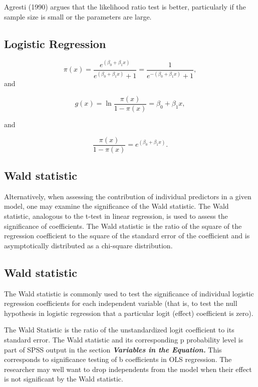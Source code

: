 \documentclass[a4paper,12pt]{article}
\begin{document}
Agresti (1990) argues that the likelihood ratio test is better, particularly if the sample size is small or the parameters are large.

\subsection{Logistic Regression}

\[ \pi(x) = \frac{e^{(\beta_0 + \beta_1 x)}} {e^{(\beta_0 + \beta_1 x)} + 1} = \frac {1} {e^{-(\beta_0 + \beta_1 x)} + 1},\]
and

\[g(x) = \ln \frac {\pi(x)} {1 - \pi(x)} = \beta_0 + \beta_1 x ,\]

and

\[\frac{\pi(x)} {1 - \pi(x)} = e^{(\beta_0 + \beta_1 x)}.\]

\subsection{Wald statistic}

Alternatively, when assessing the contribution of individual predictors in a given model, one may examine the significance of the Wald statistic. The Wald statistic, analogous to the t-test in linear regression, is used to assess the significance of coefficients. The Wald statistic is the ratio of the square of the regression coefficient to the square of the standard error of the coefficient and is asymptotically distributed as a chi-square distribution.



\subsection{Wald statistic}
The Wald statistic is commonly used to test the significance of individual logistic regression coefficients for each independent variable (that is, to test the null hypothesis in logistic regression that a particular logit (effect) coefficient is zero). 

The Wald Statistic is the ratio of the unstandardized logit coefficient to its standard error. The Wald statistic and its corresponding p probability level is part of SPSS output in the section \textbf{\textit{Variables in the Equation.}} This corresponds to significance testing of b coefficients in OLS regression. The researcher may well want to drop independents from the model when their effect is not significant by the Wald statistic.
\newpage
\end{document}
